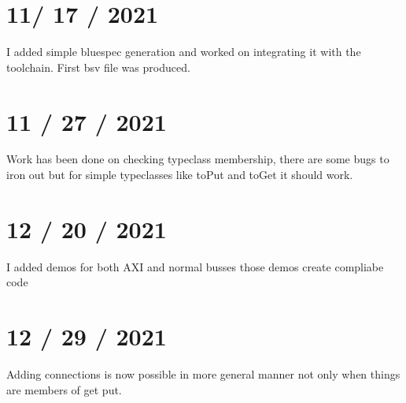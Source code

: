 \documentclass{article}
\begin{document}
\section{11/ 17 / 2021}
    I added simple bluespec generation and worked on integrating it with the toolchain. First bsv file was produced.

\section{11 / 27 / 2021}
    Work has been done on checking typeclass membership, there are some bugs to iron out but for simple typeclasses like toPut and toGet it should work.

\section{12 / 20 / 2021}
    I added demos for both AXI and normal busses those demos create compliabe code
\section{12 / 29 / 2021}
    Adding connections is now possible in more general manner not only when things are members of get put. 
\end{document}

